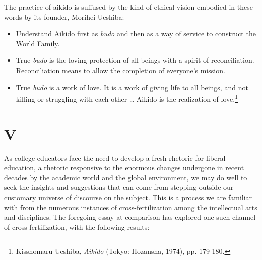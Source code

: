 The practice of aikido is suffused by the kind of ethical vision embodied in these words by its founder, Morihei Ueshiba: 
\begin{itemize}
\item Understand Aikido first as \emph{budo} and then as a way of service to construct the World Family. 
\item True \emph{budo} is the loving protection of all beings with a spirit of reconciliation. Reconciliation means to allow the completion of everyone's mission. 
\item True \emph{budo} is a work of love. It is a work of giving life to all beings, and not killing or struggling with each other \ldots{} Aikido is the realization of love.\footnote{Kisshomaru Ueshiba, \emph{Aikido} (Tokyo: Hozansha, 1974), pp. 179-180.}
\end{itemize}

\section*{V}

As college educators face the need to develop a fresh rhetoric for liberal education, a rhetoric responsive to the enormous changes undergone in recent decades by the academic world and the global environment, we may do well to seek the insights and suggestions that can come from stepping outside our customary universe of discourse on the subject. This is a process we are familiar with from the numerous instances of cross-fertilization among the intellectual arts and disciplines. The foregoing essay at comparison has explored one such channel of cross-fertilization, with the following results: 

